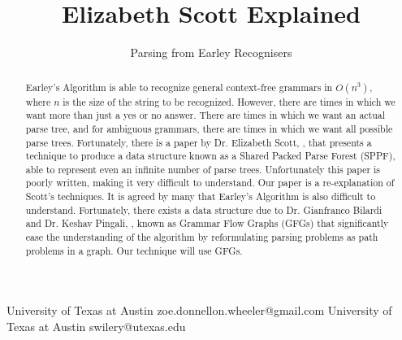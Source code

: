 \documentclass{sigplanconf}
\begin{document}
\setlength{\pdfpageheight}{\paperheight}
\setlength{\pdfpagewidth}{\paperwidth}






\title{Elizabeth Scott Explained}
\subtitle{Parsing from Earley Recognisers}

           {University of Texas at Austin}
           {zoe.donnellon.wheeler@gmail.com}
           {University of Texas at Austin}
           {swilery@utexas.edu}

\maketitle

\begin{abstract}
Earley's Algorithm is able to recognize general context-free grammars in $O(n^3)$, where $n$ is the size of the string to be recognized. However, there are times in which we want more than just a yes or no answer. There are times in which we want an actual parse tree, and for ambiguous grammars, there are times in which we want all possible parse trees. Fortunately, there is a paper by Dr. Elizabeth Scott, \cite{scott}, that presents a technique to produce a data structure known as a Shared Packed Parse Forest (SPPF), able to represent even an infinite number of parse trees. Unfortunately this paper is poorly written, making it very difficult to understand. Our paper is a re-explanation of Scott's techniques. It is agreed by many that Earley's Algorithm is also difficult to understand. Fortunately, there exists a data structure due to Dr. Gianfranco Bilardi and Dr. Keshav Pingali, \cite{bilardi-pingali}, known as Grammar Flow Graphs (GFGs) that significantly ease the understanding of the algorithm by reformulating parsing problems as path problems in a graph. Our technique will use GFGs.
\end{abstract}
\end{document}
